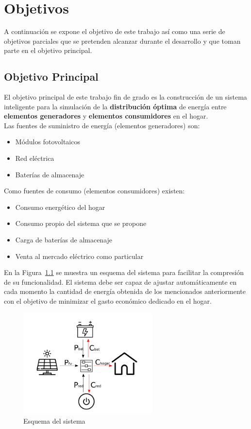 \chapter{Objetivos}
\label{cap:Objetivo}
A continuación se expone el objetivo de este trabajo así como una serie de objetivos parciales que se pretenden alcanzar durante el desarrollo y que toman parte en el objetivo principal.
\section{Objetivo Principal}
El objetivo principal de este trabajo fin de grado es la construcción de un sistema inteligente para la simulación de la \textbf{distribución óptima} de energía entre \textbf{elementos generadores} y \textbf{elementos consumidores} en el hogar.\\
Las fuentes de suministro de energía (elementos generadores) son:
\begin{itemize}
	\item Módulos fotovoltaicos
	\item Red eléctrica
	\item Baterías de almacenaje
\end{itemize}
Como fuentes de consumo (elementos consumidores) existen:
\begin{itemize}
	\item Consumo energético del hogar
	\item Consumo propio del sistema que se propone
	\item Carga de baterías de almacenaje
	\item Venta al mercado eléctrico como particular
\end{itemize}
En la Figura~\ref{fig:schema} se muestra un esquema del sistema para facilitar la compresión de su funcionalidad. El sistema debe ser capaz de ajustar automáticamente en cada momento la cantidad de energía obtenida de los mencionados anteriormente con el objetivo de minimizar el gasto económico dedicado en el hogar.

\begin{figure}[!h]
	\centering
	\includegraphics[width=7cm]{figs/Esquema.png}
	\caption{Esquema del sistema}
        \label{fig:schema}
\end{figure}

